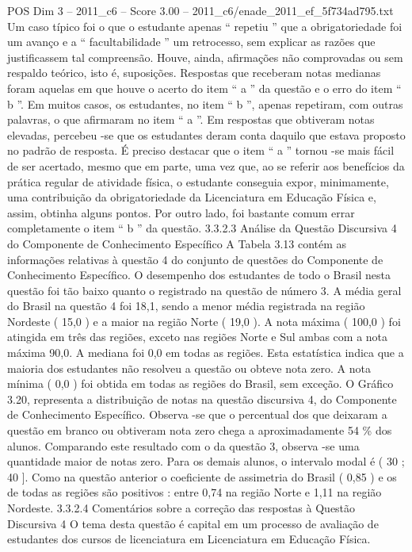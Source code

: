 \begin{textsample}{POS Dim 3 – 2011\_c6 – Score 3.00 – 2011\_c6/enade\_2011\_ef\_5f734ad795.txt}
Um caso típico foi o que o estudante apenas “ repetiu ” que a obrigatoriedade foi um avanço e a “ facultabilidade ” um retrocesso, sem explicar as razões que justificassem tal compreensão.
Houve, ainda, afirmações não comprovadas ou sem respaldo teórico, isto é, suposições.
Respostas que receberam notas medianas foram aquelas em que houve o acerto do item “ a ” da questão e o erro do item “ b ”.
Em muitos casos, os estudantes, no item “ b ”, apenas repetiram, com outras palavras, o que afirmaram no item “ a ”.
Em respostas que obtiveram notas elevadas, percebeu -se que os estudantes deram conta daquilo que estava proposto no padrão de resposta.
É preciso destacar que o item “ a ” tornou -se mais fácil de ser acertado, mesmo que em parte, uma vez que, ao se referir aos benefícios da prática regular de atividade física, o estudante conseguia expor, minimamente, uma contribuição da obrigatoriedade da Licenciatura em Educação Física e, assim, obtinha alguns pontos.
Por outro lado, foi bastante comum errar completamente o item “ b ” da questão. 3.3.2.3 Análise da Questão Discursiva 4 do Componente de Conhecimento Específico A Tabela 3.13 contém as informações relativas à questão 4 do conjunto de questões do Componente de Conhecimento Específico.
O desempenho dos estudantes de todo o Brasil nesta questão foi tão baixo quanto o registrado na questão de número 3.
A média geral do Brasil na questão 4 foi 18,1, sendo a menor média registrada na região Nordeste ( 15,0 ) e a maior na região Norte ( 19,0 ).
A nota máxima ( 100,0 ) foi atingida em três das regiões, exceto nas regiões Norte e Sul ambas com a nota máxima 90,0.
A mediana foi 0,0 em todas as regiões.
Esta estatística indica que a maioria dos estudantes não resolveu a questão ou obteve nota zero.
A nota mínima ( 0,0 ) foi obtida em todas as regiões do Brasil, sem exceção.
O Gráfico 3.20, representa a distribuição de notas na questão discursiva 4, do Componente de Conhecimento Específico.
Observa -se que o percentual dos que deixaram a questão em branco ou obtiveram nota zero chega a aproximadamente 54 \% dos alunos.
Comparando este resultado com o da questão 3, observa -se uma quantidade maior de notas zero.
Para os demais alunos, o intervalo modal é ( 30 ; 40 ].
Como na questão anterior o coeficiente de assimetria do Brasil ( 0,85 ) e os de todas as regiões são positivos : entre 0,74 na região Norte e 1,11 na região Nordeste. 3.3.2.4 Comentários sobre a correção das respostas à Questão Discursiva 4 O tema desta questão é capital em um processo de avaliação de estudantes dos cursos de licenciatura em Licenciatura em Educação Física.

\end{textsample}
